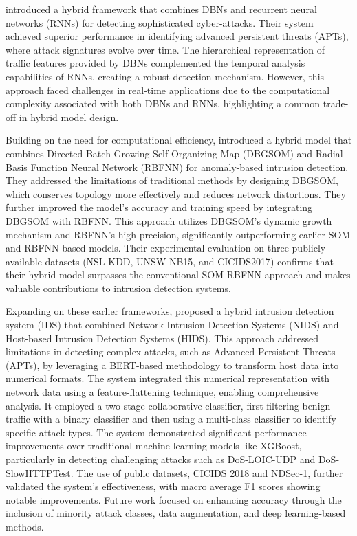 \citet{xuan2021multi} introduced a hybrid framework that combines DBNs and recurrent neural networks (RNNs) for detecting sophisticated cyber-attacks. Their system achieved superior performance in identifying advanced persistent threats (APTs), where attack signatures evolve over time. The hierarchical representation of traffic features provided by DBNs complemented the temporal analysis capabilities of RNNs, creating a robust detection mechanism. However, this approach faced challenges in real-time applications due to the computational complexity associated with both DBNs and RNNs, highlighting a common trade-off in hybrid model design.

Building on the need for computational efficiency, \citet{albahar2020hybrid} introduced a hybrid model that combines Directed Batch Growing Self-Organizing Map (DBGSOM) and Radial Basis Function Neural Network (RBFNN) for anomaly-based intrusion detection. They addressed the limitations of traditional methods by designing DBGSOM, which conserves topology more effectively and reduces network distortions. They further improved the model's accuracy and training speed by integrating DBGSOM with RBFNN. This approach utilizes DBGSOM's dynamic growth mechanism and RBFNN's high precision, significantly outperforming earlier SOM and RBFNN-based models. Their experimental evaluation on three publicly available datasets (NSL-KDD, UNSW-NB15, and CICIDS2017) confirms that their hybrid model surpasses the conventional SOM-RBFNN approach and makes valuable contributions to intrusion detection systems.

Expanding on these earlier frameworks, \citet{chen2024machine} proposed a hybrid intrusion detection system (IDS) that combined Network Intrusion Detection Systems (NIDS) and Host-based Intrusion Detection Systems (HIDS). This approach addressed limitations in detecting complex attacks, such as Advanced Persistent Threats (APTs), by leveraging a BERT-based methodology to transform host data into numerical formats. The system integrated this numerical representation with network data using a feature-flattening technique, enabling comprehensive analysis. It employed a two-stage collaborative classifier, first filtering benign traffic with a binary classifier and then using a multi-class classifier to identify specific attack types. The system demonstrated significant performance improvements over traditional machine learning models like XGBoost, particularly in detecting challenging attacks such as DoS-LOIC-UDP and DoS-SlowHTTPTest. The use of public datasets, CICIDS 2018 and NDSec-1, further validated the system's effectiveness, with macro average F1 scores showing notable improvements. Future work focused on enhancing accuracy through the inclusion of minority attack classes, data augmentation, and deep learning-based methods.

